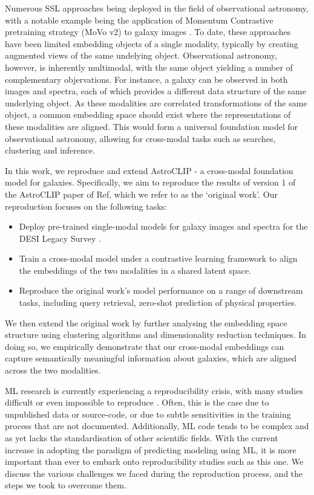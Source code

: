 \documentclass[a4paper,12pt]{article}
\begin{document}
Numerous SSL approaches being deployed in the field of observational astronomy, with a notable example being the application of Momentum Contrastive pretraining strategy (MoVo v2) to galaxy images \cite{stein}. To date, these approaches have been limited embedding objects of a single modality, typically by creating augmented views of the same undelying object. Observational astronomy, however, is inherently multimodal, with the same object yielding a number of complementary objervations. For instance, a galaxy can be observed in both images and spectra, each of which provides a different data structure of the same underlying object. As these modalities are correlated transformations of the same object, a common embedding space should exist where the representations of these modalities are aligned. This would form a universal foundation model for observational astronomy, allowing for cross-modal tasks such as searches, clustering and inference.

In this work, we reproduce and extend AstroCLIP - a cross-modal foundation model for galaxies. Specifically, we aim to reproduce the results of version 1 of the AstroCLIP paper of Ref\cite{astroclip}, which we refer to as the `original work'. Our reproduction focuses on the following tasks:
\begin{itemize}
    \item Deploy pre-trained single-modal models for galaxy images and spectra for the DESI Legacy Survey \cite{DESI}.
    \item Train a cross-modal model under a contrastive learning framework to align the embeddings of the two modalities in a shared latent space.
    \item Reproduce the original work's model performance on a range of downstream tasks, including query retrieval, zero-shot prediction of physical properties.
\end{itemize}
We then extend the original work by further analysing the embedding space structure using clustering algorithms and dimensionality reduction techniques. In doing so, we empirically demonstrate that our cross-modal embeddings can capture semantically meaningful information about galaxies, which are aligned across the two modalities.

ML research is currently experiencing a reproducibility crisis, with many studies difficult or even impossible to reproduce \cite{kapoor2023leakage}. Often, this is the case due to unpublished data or source-code, or due to subtle sensitivities in the training process that are not documented. Additionally, ML code tends to be complex and as yet lacks the standardisation of other scientific fields. With the current increase in adopting the paradigm of predicting modeling using ML, it is more important than ever to embark onto reproducibility studies such as this one. We discuss the various challenges we faced during the reproduction process, and the steps we took to overcome them. 
\end{document}
